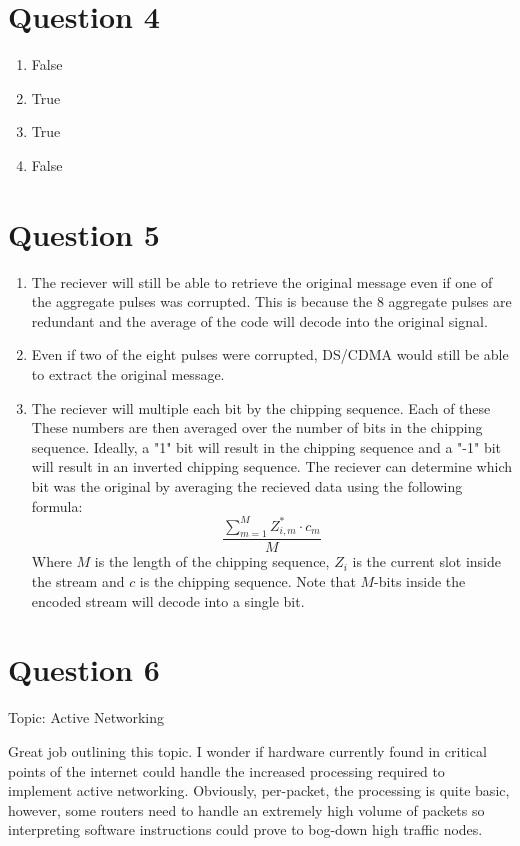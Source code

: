 \documentclass[12pt,letterpaper]{article}
\newcommand\ddfrac[2]{\frac{\displaystyle #1}{\displaystyle #2}}
\begin{document}
\section*{Question 4}
\begin{enumerate}[label=\alph*)]
\item False
\item True
\item True
\item False
\end{enumerate}

\section*{Question 5}
\begin{enumerate}[label=\alph*)]
\item The reciever will still be able to retrieve the original message even
      if one of the aggregate pulses was corrupted. This is because the 8
      aggregate pulses are redundant and the average of the code will decode
      into the original signal.
\item Even if two of the eight pulses were corrupted, DS/CDMA would still be
      able to extract the original message.
\item The reciever will multiple each bit by the chipping sequence. Each of these
      These numbers are then averaged over the number of bits in the chipping
      sequence. Ideally, a "1" bit will result in the chipping sequence and a "-1"
      bit will result in an inverted chipping sequence. The reciever can determine
      which bit was the original by averaging the recieved data using the following
      formula:
      \begin{equation*}
      \ddfrac{\sum_{m=1}^{M}{Z_{i,m}^*\cdot c_m}}{M}
      \end{equation*}
      Where $M$ is the length of the chipping sequence,
      $Z_{i}$ is the current slot inside the stream and $c$ is the
      chipping sequence. Note that $M$-bits inside the encoded stream will
      decode into a single bit.
\end{enumerate}

\section*{Question 6}
Topic: Active Networking

Great job outlining this topic. I wonder if hardware currently found in critical points of the internet could handle the increased processing required to implement active networking. Obviously, per-packet, the processing is quite basic, however, some routers need to handle an extremely high volume of packets so interpreting software instructions could prove to bog-down high traffic nodes.
\end{document}
